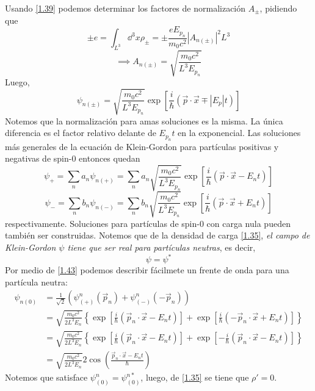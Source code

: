 Usando \eqref{1.39} podemos determinar los factores de normalización $A_{\pm }$, pidiendo que
\begin{equation}
  \pm e=\int_{L^3}\dd^3x\rho_\pm =\pm \frac{e E_{p_n}}{m_0c^2}|A_{n(\pm )}|^2L^3
\end{equation}
\begin{equation}
  \implies A_{n(\pm )}=\sqrt{\frac{m_0c^2}{L^3E_{p_n}}}
\end{equation}
Luego,
\begin{equation}\label{1.43}
  \psi_{n(\pm )}=\sqrt{\frac{m_0c^2}{L^3E_{p_n}}}\exp\left[\frac{i}{\hbar}(\vec{p}\cdot\vec{x}\mp |E_p|t)\right]
\end{equation}
Notemos que la normalización para amas soluciones es la misma. La única diferencia es el factor relativo delante de $E_{p_n}t$ en la exponencial. Las soluciones más generales de la ecuación de Klein-Gordon para partículas positivas y negativas de spin-$0$ entonces quedan
\begin{equation}
  \psi_+=\sum_na_n\psi_{n(+)}=\sum_na_n\sqrt{\frac{m_0c^2}{L^3E_{p_n}}}\exp\left[\frac{i}{\hbar}(\vec{p}\cdot\vec{x}- E_nt)\right]
\end{equation}
\begin{equation}
  \psi_-=\sum_nb_n\psi_{n(-)}=\sum_nb_n\sqrt{\frac{m_0c^2}{L^3E_{p_n}}}\exp\left[\frac{i}{\hbar}(\vec{p}\cdot\vec{x}+ E_nt)\right]
\end{equation}
respectivamente. Soluciones para partículas de spin-$0$ con carga nula pueden también ser construidas. Notemos que de la densidad de carga \eqref{1.35}, \textit{el campo de Klein-Gordon $\psi$ tiene que ser real para partículas neutras}, es decir,
\begin{equation}
  \psi=\psi^*
\end{equation}
Por medio de \eqref{1.43} podemos describir fácilmete un frente de onda para una partícula neutra:
\begin{align}
  \psi_{n(0)}&=\frac{1}{\sqrt{2}}\left(\psi^n_{(+)}(\vec{p}_n)+\psi^n_{(-)}(-\vec{p}_n)\right)\\
  &=\sqrt{\frac{m_0c^2}{2L^3E_n}}\left\{\exp\left[\frac{i}{\hbar}(\vec{p}_n\cdot\vec{x}-E_nt)\right]+\exp\left[\frac{i}{\hbar}(-\vec{p}_n\cdot\vec{x}+E_nt)\right]\right\}\\
  &=\sqrt{\frac{m_0c^2}{2L^3E_n}}\left\{\exp\left[\frac{i}{\hbar}(\vec{p}_n\cdot\vec{x}-E_nt)\right]+\exp\left[-\frac{i}{\hbar}(\vec{p}_n\cdot\vec{x}-E_nt)\right]\right\}\\
  &=\sqrt{\frac{m_0c^2}{2L^3E_n}}2\cos\left(\frac{\vec{p}_n\cdot\vec{x}-E_nt}{\hbar}\right)
\end{align}
Notemos que satisface $\psi^n_{(0)}=\psi^{n*}_{(0)}$, luego, de \eqref{1.35} se tiene que $\rho'=0$.

